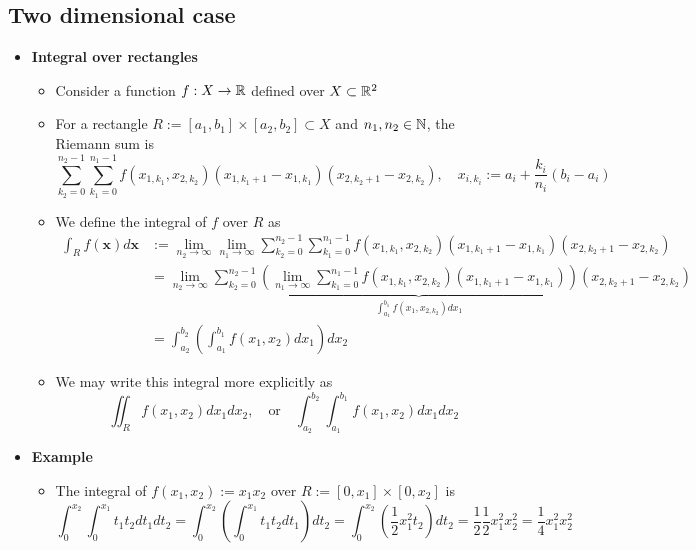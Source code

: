 \documentclass[12pt,a4paper]{article}
\begin{document}
\clearpage
\subsection{Two dimensional case}

\begin{itemize}

\item \textbf{Integral over rectangles}
  \begin{itemize}
  \item Consider a function $f:X \to \mathbb{R}$ defined over $X\subset \mathbb{R}^{2}$
  \item For a rectangle $R:=[a_{1}, b_{1}]\times [a_{2}, b_{2}]\subset X$ and $n_{1},n_{2}\in \mathbb{N}$,
    the Riemann sum is
    \begin{equation}\nonumber%
      \sum_{k_{2}=0}^{n_{2}-1}\sum_{k_{1}=0}^{n_{1}-1}f(x_{1,k_{1}},x_{2,k_{2}})(x_{1,k_{1}+1}-x_{1,k_{1}})(x_{2,k_{2}+1}-x_{2,k_{2}}),
      \quad x_{i,k_{i}}:= a_{i} + \frac{k_{i}}{n_{i}}(b_{i}-a_{i})
    \end{equation}
  \item We define the integral of $f$ over $R$ as
    \begin{align}
      \int_{R}f(\bm{x})d\bm{x}
      & := \lim_{n_{2}\to \infty}\lim_{n_{1}\to \infty}\sum_{k_{2}=0}^{n_{2}-1}\sum_{k_{1}=0}^{n_{1}-1}f(x_{1,k_{1}},x_{2,k_{2}})(x_{1,k_{1}+1}-x_{1,k_{1}})(x_{2,k_{2}+1}-x_{2,k_{2}}) \nonumber \\
      & = \lim_{n_{2}\to \infty}\sum_{k_{2}=0}^{n_{2}-1}\underbrace{\left(\lim_{n_{1}\to \infty}\sum_{k_{1}=0}^{n_{1}-1}f(x_{1,k_{1}},x_{2,k_{2}})(x_{1,k_{1}+1}-x_{1,k_{1}})\right)}_{\int_{a_{1}}^{b_{1}}f(x_{1},x_{2,k_{2}})dx_{1}}(x_{2,k_{2}+1}-x_{2,k_{2}}) \nonumber \\
      & = \int_{a_{2}}^{b_{2}}\left(\int_{a_{1}}^{b_{1}}f(x_{1},x_{2})dx_{1}\right)dx_{2} \nonumber%
    \end{align}
  \item We may write this integral more explicitly as
    \begin{equation}\nonumber%
      \iint_{R}f(x_{1},x_{2})dx_{1}dx_{2},
      \quad\text{or}\quad
      \int_{a_{2}}^{b_{2}}\int_{a_{1}}^{b_{1}}f(x_{1},x_{2})dx_{1}dx_{2}
    \end{equation}
  \end{itemize}

\item \textbf{Example}
  \begin{itemize}
  \item The integral of $f(x_{1},x_{2}):=x_{1}x_{2}$ over $R:=[0,x_{1}]\times [0, x_{2}]$ is
    \begin{equation}\nonumber%
      \int_{0}^{x_{2}}\int_{0}^{x_{1}}t_{1}t_{2}dt_{1}dt_{2}
      = 
      \int_{0}^{x_{2}}\left(\int_{0}^{x_{1}}t_{1}t_{2}dt_{1}\right)dt_{2}
      = 
      \int_{0}^{x_{2}}\left(\frac{1}{2}x_{1}^{2}t_{2}\right)dt_{2}
      = 
      \frac{1}{2}\frac{1}{2}x_{1}^{2}x_{2}^{2}
      = 
      \frac{1}{4}x_{1}^{2}x_{2}^{2}
    \end{equation}
  \end{itemize}


\end{itemize}
\end{document}

